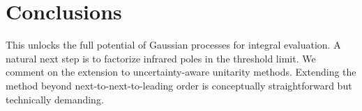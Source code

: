 \section{Conclusions}\label{sec:conclusions}

This unlocks the full potential of Gaussian processes for integral
evaluation. A natural next step is to factorize infrared poles in the
threshold limit. We comment on the extension to uncertainty-aware
unitarity methods. Extending the method beyond next-to-next-to-leading
order is conceptually straightforward but technically demanding.

